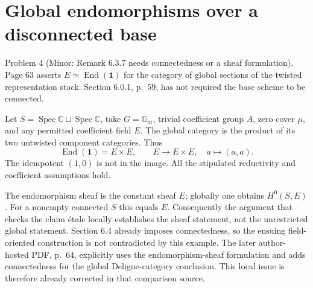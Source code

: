 \documentclass[10pt]{article}
\begin{document}
\section*{Global endomorphisms over a disconnected base}
Problem 4 (Minor: Remark 6.3.7 needs connectedness or a sheaf formulation).  Page 63 asserts \(E\simeq\operatorname{End}(\mathbf1)\) for the category of global sections of the twisted representation stack. Section 6.0.1, p. 59, has not required the base scheme to be connected.\par
Let \(S=\operatorname{Spec}\mathbb C\sqcup\operatorname{Spec}\mathbb C\), take \(G=\mathbb G_m\), trivial coefficient group \(A\), zero cover \(\mu\), and any permitted coefficient field \(E\). The global category is the product of its two untwisted component categories. Thus \[\operatorname{End}(\mathbf1)=E\times E,
 \qquad E\longrightarrow E\times E,\quad a\longmapsto(a,a).\] The idempotent \((1,0)\) is not in the image. All the stipulated reductivity and coefficient assumptions hold.\par
The endomorphism sheaf is the constant sheaf \(E\); globally one obtains \(H^0(S,E)\). For a nonempty connected \(S\) this equals \(E\). Consequently the argument that checks the claim étale locally establishes the sheaf statement, not the unrestricted global statement. Section 6.4 already imposes connectedness, so the ensuing field-oriented construction is not contradicted by this example. The later author-hosted PDF, p. 64, explicitly uses the endomorphism-sheaf formulation and adds connectedness for the global Deligne-category conclusion. This local issue is therefore already corrected in that comparison source.\par
\end{document}
